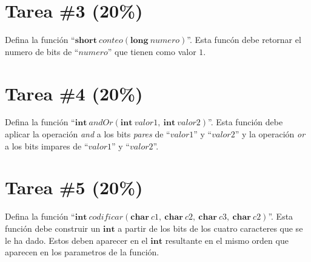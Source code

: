 \documentclass{article}
\begin{document}
\section*{Tarea \#3 (20\%)}

Defina la funci\'on ``$\mathbf{short}\ conteo(\mathbf{long}\ numero)$''. Esta func\'on debe retornar
el numero de bits de ``$numero$'' que tienen como valor $1$.

\section*{Tarea \#4 (20\%)}

Defina la funci\'on ``$\mathbf{int}\ andOr(\mathbf{int}\ valor1,\ \mathbf{int}\ valor2)$''. Esta funci\'on debe aplicar la
operaci\'on \emph{and} a los bits \emph{pares} de ``$valor1$'' y ``$valor2$'' y la operaci\'on \emph{or} a los bits
impares de ``$valor1$'' y ``$valor2$''.

\section*{Tarea \#5 (20\%)}

Defina la funci\'on ``$\mathbf{int}\ codificar(\mathbf{char}\ c1,\ \mathbf{char}\ c2,\ \mathbf{char}\ c3,\ \mathbf{char}\ c2)$''.
Esta funci\'on debe construir un $\mathbf{int}$ a partir de los bits de los cuatro caracteres que se le ha dado.
Estos deben aparecer en el $\mathbf{int}$ resultante en el mismo orden que aparecen en los parametros de la funci\'on.
\end{document}
